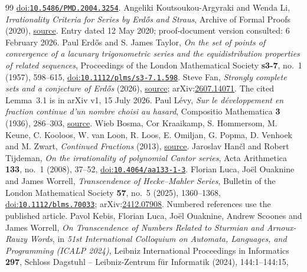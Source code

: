 \documentclass[11pt]{article}
\theoremstyle{remark}
\theoremstyle{plain}
\begin{document}
\begin{thebibliography}{99}
  \href{https://doi.org/10.5486/PMD.2004.3254}{doi:\nolinkurl{10.5486/PMD.2004.3254}}.
 Angeliki Koutsoukou-Argyraki and Wenda Li,
  \emph{Irrationality Criteria for Series by Erd\H{o}s and Straus}, Archive of Formal Proofs (2020),
  \href{https://isa-afp.org/entries/Irrational_Series_Erdos_Straus.html}{source}. Entry dated 12 May 2020; proof-document version consulted: 6 February 2026.
 Paul Erd\H{o}s and S. James Taylor,
  \emph{On the set of points of convergence of a lacunary trigonometric series and the equidistribution properties of related sequences}, Proceedings of the London Mathematical Society \textbf{s3-7}, no.~1 (1957), 598--615,
  \href{https://doi.org/10.1112/plms/s3-7.1.598}{doi:\nolinkurl{10.1112/plms/s3-7.1.598}}.
 Steve Fan,
  \emph{Strongly complete sets and a conjecture of Erd\H{o}s} (2026),
  \href{https://arxiv.org/abs/2607.14071v1}{source}; arXiv:\href{https://arxiv.org/abs/2607.14071}{2607.14071}. The cited Lemma~3.1 is in arXiv v1, 15 July 2026.
 Paul L\'{e}vy,
  \emph{Sur le d\'{e}veloppement en fraction continue d'un nombre choisi au hasard}, Compositio Mathematica \textbf{3} (1936), 286--303,
  \href{https://www.numdam.org/item/CM_1936__3__286_0/}{source}.
 Wieb Bosma, Cor Kraaikamp, S. Hommersom, M. Keune, C. Kooloos, W. van Loon, R. Loos, E. Omiljan, G. Popma, D. Venhoek and M. Zwart,
  \emph{Continued Fractions} (2013),
  \href{https://www.math.ru.nl/~bosma/Students/CF.pdf}{source}.
 Jaroslav Han\v{c}l and Robert Tijdeman,
  \emph{On the irrationality of polynomial Cantor series}, Acta Arithmetica \textbf{133}, no.~1 (2008), 37--52,
  \href{https://doi.org/10.4064/aa133-1-3}{doi:\nolinkurl{10.4064/aa133-1-3}}.
 Florian Luca, Jo\"{e}l Ouaknine and James Worrell,
  \emph{Transcendence of Hecke--Mahler Series}, Bulletin of the London Mathematical Society \textbf{57}, no.~5 (2025), 1360--1368,
  \href{https://doi.org/10.1112/blms.70033}{doi:\nolinkurl{10.1112/blms.70033}}; arXiv:\href{https://arxiv.org/abs/2412.07908}{2412.07908}. Numbered references use the published article.
 Pavol Kebis, Florian Luca, Jo\"{e}l Ouaknine, Andrew Scoones and James Worrell,
  \emph{On Transcendence of Numbers Related to Sturmian and Arnoux-Rauzy Words}, in \emph{51st International Colloquium on Automata, Languages, and Programming (ICALP 2024)}, Leibniz International Proceedings in Informatics \textbf{297}, Schloss Dagstuhl -- Leibniz-Zentrum f\"{u}r Informatik (2024), 144:1--144:15,

\end{thebibliography}
\end{document}
